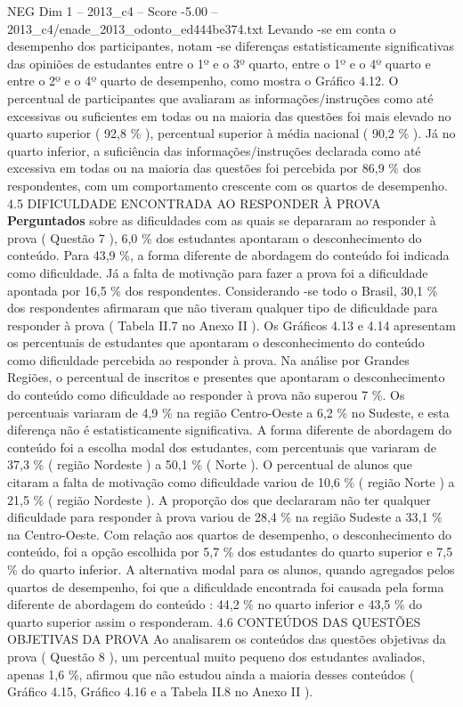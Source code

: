 \begin{textsample}{NEG Dim 1 – 2013\_c4 – Score -5.00 – 2013\_c4/enade\_2013\_odonto\_ed444be374.txt}
Levando -se em conta o desempenho dos participantes, notam -se diferenças estatisticamente significativas das opiniões de estudantes entre o 1º e o 3º quarto, entre o 1º e o 4º quarto e entre o 2º e o 4º quarto de desempenho, como mostra o Gráfico 4.12.
O percentual de participantes que avaliaram as informações/instruções como até excessivas ou suficientes em todas ou na maioria das questões foi mais elevado no quarto superior ( 92,8 \% ), percentual superior à média nacional ( 90,2 \% ).
Já no quarto inferior, a suficiência das informações/instruções declarada como até excessiva em todas ou na maioria das questões foi percebida por 86,9 \% dos respondentes, com um comportamento crescente com os quartos de desempenho. 4.5 DIFICULDADE ENCONTRADA AO RESPONDER À PROVA \textbf{Perguntados} sobre as dificuldades com as quais se depararam ao responder à prova ( Questão 7 ), 6,0 \% dos estudantes apontaram o desconhecimento do conteúdo.
Para 43,9 \%, a forma diferente de abordagem do conteúdo foi indicada como dificuldade.
Já a falta de motivação para fazer a prova foi a dificuldade apontada por 16,5 \% dos respondentes.
Considerando -se todo o Brasil, 30,1 \% dos respondentes afirmaram que não tiveram qualquer tipo de dificuldade para responder à prova ( Tabela II.7 no Anexo II ).
Os Gráficos 4.13 e 4.14 apresentam os percentuais de estudantes que apontaram o desconhecimento do conteúdo como dificuldade percebida ao responder à prova.
Na análise por Grandes Regiões, o percentual de inscritos e presentes que apontaram o desconhecimento do conteúdo como dificuldade ao responder à prova não superou 7 \%.
Os percentuais variaram de 4,9 \% na região Centro-Oeste a 6,2 \% no Sudeste, e esta diferença não é estatisticamente significativa.
A forma diferente de abordagem do conteúdo foi a escolha modal dos estudantes, com percentuais que variaram de 37,3 \% ( região Nordeste ) a 50,1 \% ( Norte ).
O percentual de alunos que citaram a falta de motivação como dificuldade variou de 10,6 \% ( região Norte ) a 21,5 \% ( região Nordeste ).
A proporção dos que declararam não ter qualquer dificuldade para responder à prova variou de 28,4 \% na região Sudeste a 33,1 \% na Centro-Oeste.
Com relação aos quartos de desempenho, o desconhecimento do conteúdo, foi a opção escolhida por 5,7 \% dos estudantes do quarto superior e 7,5 \% do quarto inferior.
A alternativa modal para os alunos, quando agregados pelos quartos de desempenho, foi que a dificuldade encontrada foi causada pela forma diferente de abordagem do conteúdo : 44,2 \% no quarto inferior e 43,5 \% do quarto superior assim o responderam. 4.6 CONTEÚDOS DAS QUESTÕES OBJETIVAS DA PROVA Ao analisarem os conteúdos das questões objetivas da prova ( Questão 8 ), um percentual muito pequeno dos estudantes avaliados, apenas 1,6 \%, afirmou que não estudou ainda a maioria desses conteúdos ( Gráfico 4.15, Gráfico 4.16 e a Tabela II.8 no Anexo II ).

\end{textsample}
